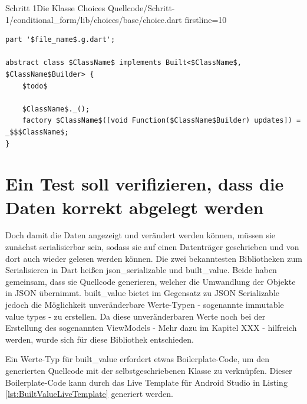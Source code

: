 \begin{alexlistingzwei}{Schritt 1}{Die Klasse Choices}
  {Quellcode/Schritt-1/conditional_form/lib/choices/base/choice.dart}
  {firstline=10}
  \label{lst:Schritt1KlasseChoices}
\end{alexlistingzwei}

\begin{listing}[h]
  \begin{verbatim}
part '$file_name$.g.dart';

abstract class $ClassName$ implements Built<$ClassName$, $ClassName$Builder> {
    $todo$
    
    $ClassName$._();
    factory $ClassName$([void Function($ClassName$Builder) updates]) = _$$$ClassName$;
}
\end{verbatim}
  \caption[built_value Live Template]{Live Template für die Erstellung von built_value Boilerplate-Code in Android Studio, Quelle: Jetbrains Marketplace Built Value Snippets Plugin}
  \label{lst:BuiltValueLiveTemplate}
\end{listing}


\section{Ein Test soll verifizieren, dass die Daten korrekt abgelegt werden}



Doch damit die Daten angezeigt und verändert werden können, müssen sie zunächst serialisierbar sein, sodass sie auf einen Datenträger geschrieben und von dort auch wieder gelesen werden können.
Die zwei bekanntesten Bibliotheken zum Serialisieren in Dart heißen json_serializable und built_value.
Beide haben gemeinsam, dass sie Quellcode generieren, welcher die Umwandlung der Objekte in JSON übernimmt.
built_value bietet im Gegensatz zu JSON Serializable jedoch die Möglichkeit unveränderbare Werte-Typen -  sogenannte immutable value types -  zu erstellen. Da diese  unveränderbaren Werte noch bei der Erstellung des sogenannten ViewModels -  Mehr dazu im Kapitel XXX - hilfreich werden, wurde sich für diese Bibliothek entschieden.

Ein Werte-Typ für built_value erfordert etwas Boilerplate-Code,  um den generierten Quellcode mit der selbstgeschriebenen Klasse zu verknüpfen.  Dieser Boilerplate-Code kann durch das Live Template für Android Studio in Listing \ref{lst:BuiltValueLiveTemplate} generiert werden. 






